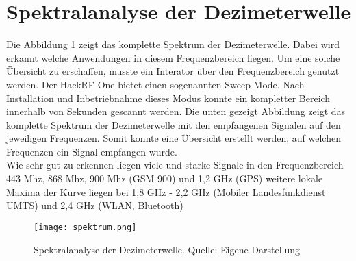 \newpage
\section{Spektralanalyse der Dezimeterwelle}
Die Abbildung \ref{spektralanalyse} zeigt das komplette Spektrum der Dezimeterwelle. Dabei wird erkannt welche Anwendungen in diesem Frequenzbereich liegen. Um eine solche Übersicht zu erschaffen, musste ein Interator über den Frequenzbereich genutzt werden. Der HackRF One bietet einen sogenannten Sweep Mode. Nach Installation und Inbetriebnahme dieses Modus konnte ein kompletter Bereich innerhalb von Sekunden gescannt werden. Die unten gezeigt Abbildung zeigt das komplette Spektrum der Dezimeterwelle mit den empfangenen Signalen auf den jeweiligen Frequenzen. Somit konnte eine Übersicht erstellt werden, auf welchen Frequenzen ein Signal empfangen wurde.\\

Wie sehr gut zu erkennen liegen viele und starke Signale in den Frequenzbereich 443 Mhz, 868 Mhz, 900 Mhz (GSM 900) und 1,2 GHz (GPS) weitere lokale Maxima der Kurve liegen bei 1,8 GHz - 2,2 GHz (Mobiler Landesfunkdienst UMTS) und 2,4 GHz (WLAN, Bluetooth)
\begin{figure}[H]
	\centering
	\texttt{[image: spektrum.png]}
	\caption[Spektralanalyse der Dezimeterwelle]{Spektralanalyse der Dezimeterwelle. Quelle: Eigene Darstellung} 
	\label{spektralanalyse}
\end{figure}
